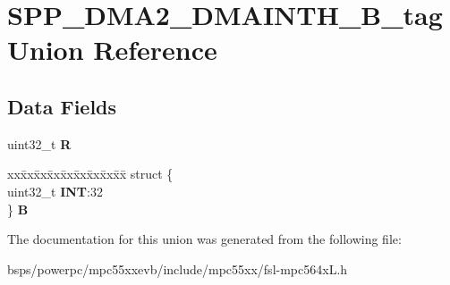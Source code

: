 \hypertarget{unionSPP__DMA2__DMAINTH__32B__tag}{}\section{S\+P\+P\+\_\+\+D\+M\+A2\+\_\+\+D\+M\+A\+I\+N\+T\+H\+\_\+B\+\_\+tag Union Reference}
\label{unionSPP__DMA2__DMAINTH__32B__tag}
\subsection*{Data Fields}
\begin{DoxyCompactItemize}
\item 
\mbox{\label{unionSPP__DMA2__DMAINTH__32B__tag_a1ce45ae4b9f12fad90ba98e165430165}} 
uint32\+\_\+t {\bfseries R}
\item 
\mbox{\label{unionSPP__DMA2__DMAINTH__32B__tag_ad798d2d109c52f1732d806f7d6ef1354}} 
\begin{tabbing}
xx\=xx\=xx\=xx\=xx\=xx\=xx\=xx\=xx\=\kill
struct \{\\
\>uint32\_t {\bfseries INT}:32\\
\} {\bfseries B}\\

\end{tabbing}\end{DoxyCompactItemize}


The documentation for this union was generated from the following file\+:\begin{DoxyCompactItemize}
\item 
bsps/powerpc/mpc55xxevb/include/mpc55xx/fsl-\/mpc564x\+L.\+h\end{DoxyCompactItemize}

